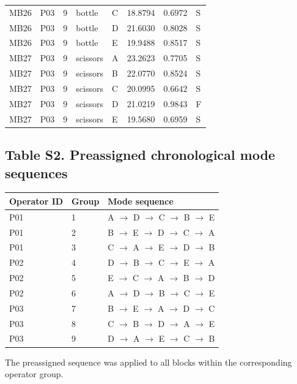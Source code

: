 \documentclass[11pt]{article}
\begin{document}
\begin{longtable}{lll llrrl}
MB26 & P03 & 9 & bottle & C & 18.8794 & 0.6972 & S \\
MB26 & P03 & 9 & bottle & D & 21.6030 & 0.8028 & S \\
MB26 & P03 & 9 & bottle & E & 19.9488 & 0.8517 & S \\
MB27 & P03 & 9 & scissors & A & 23.2623 & 0.7705 & S \\
MB27 & P03 & 9 & scissors & B & 22.0770 & 0.8524 & S \\
MB27 & P03 & 9 & scissors & C & 20.0995 & 0.6642 & S \\
MB27 & P03 & 9 & scissors & D & 21.0219 & 0.9843 & F \\
MB27 & P03 & 9 & scissors & E & 19.5680 & 0.6959 & S \\
\bottomrule
\end{longtable}
\normalsize
\subsection*{Table S2. Preassigned chronological mode sequences}
\begin{tabular}{lll}
\toprule
Operator ID & Group & Mode sequence \\
\midrule
P01 & 1 & A $\rightarrow$ D $\rightarrow$ C $\rightarrow$ B $\rightarrow$ E \\
P01 & 2 & B $\rightarrow$ E $\rightarrow$ D $\rightarrow$ C $\rightarrow$ A \\
P01 & 3 & C $\rightarrow$ A $\rightarrow$ E $\rightarrow$ D $\rightarrow$ B \\
P02 & 4 & D $\rightarrow$ B $\rightarrow$ C $\rightarrow$ E $\rightarrow$ A \\
P02 & 5 & E $\rightarrow$ C $\rightarrow$ A $\rightarrow$ B $\rightarrow$ D \\
P02 & 6 & A $\rightarrow$ D $\rightarrow$ B $\rightarrow$ C $\rightarrow$ E \\
P03 & 7 & B $\rightarrow$ E $\rightarrow$ A $\rightarrow$ D $\rightarrow$ C \\
P03 & 8 & C $\rightarrow$ B $\rightarrow$ D $\rightarrow$ A $\rightarrow$ E \\
P03 & 9 & D $\rightarrow$ A $\rightarrow$ E $\rightarrow$ C $\rightarrow$ B \\
\bottomrule
\end{tabular}

\smallskip
\noindent The preassigned sequence was applied to all blocks within the corresponding operator group.
\end{document}
